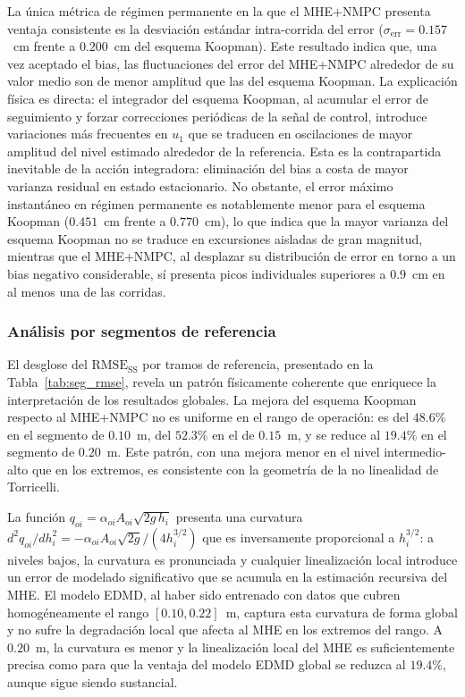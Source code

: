 \documentclass[12pt,letterpaper]{article}
\begin{document}
La única métrica de régimen permanente en la que el MHE+NMPC 
presenta ventaja consistente es la desviación estándar 
intra-corrida del error ($\sigma_{\mathrm{err}} = 0.157$~cm 
frente a $0.200$~cm del esquema Koopman). Este resultado indica 
que, una vez aceptado el bias, las fluctuaciones del error del 
MHE+NMPC alrededor de su valor medio son de menor amplitud que 
las del esquema Koopman. La explicación física es directa: el 
integrador del esquema Koopman, al acumular el error de 
seguimiento y forzar correcciones periódicas de la señal de 
control, introduce variaciones más frecuentes en $u_1$ que se 
traducen en oscilaciones de mayor amplitud del nivel estimado 
alrededor de la referencia. Esta es la contrapartida inevitable 
de la acción integradora: eliminación del bias a costa de mayor 
varianza residual en estado estacionario. No obstante, el error 
máximo instantáneo en régimen permanente es notablemente menor 
para el esquema Koopman ($0.451$~cm frente a $0.770$~cm), lo que 
indica que la mayor varianza del esquema Koopman no se traduce en 
excursiones aisladas de gran magnitud, mientras que el MHE+NMPC, 
al desplazar su distribución de error en torno a un bias negativo 
considerable, sí presenta picos individuales superiores a 
$0.9$~cm en al menos una de las corridas.

\subsubsection{Análisis por segmentos de referencia}
\label{sec:analisis_exp_seg}

El desglose del $\mathrm{RMSE}_{\mathrm{SS}}$ por tramos de 
referencia, presentado en la Tabla~\ref{tab:seg_rmse}, revela un 
patrón físicamente coherente que enriquece la interpretación de 
los resultados globales. La mejora del esquema Koopman respecto al 
MHE+NMPC no es uniforme en el rango de operación: es del $48.6\%$ 
en el segmento de $0.10$~m, del $52.3\%$ en el de $0.15$~m, y se 
reduce al $19.4\%$ en el segmento de $0.20$~m. Este patrón, con 
una mejora menor en el nivel intermedio-alto que en los extremos, 
es consistente con la geometría de la no linealidad de Torricelli.

La función $q_{oi} = \alpha_{oi} A_{oi} \sqrt{2g\,h_i}$ presenta 
una curvatura $d^2q_{oi}/dh_i^2 = -\alpha_{oi} A_{oi} \sqrt{2g} 
/ (4 h_i^{3/2})$ que es inversamente proporcional a $h_i^{3/2}$: 
a niveles bajos, la curvatura es pronunciada y cualquier 
linealización local introduce un error de modelado significativo 
que se acumula en la estimación recursiva del MHE. El modelo EDMD, 
al haber sido entrenado con datos que cubren homogéneamente el 
rango $[0.10, 0.22]$~m, captura esta curvatura de forma global y 
no sufre la degradación local que afecta al MHE en los extremos 
del rango. A $0.20$~m, la curvatura es menor y la linealización 
local del MHE es suficientemente precisa como para que la ventaja 
del modelo EDMD global se reduzca al $19.4\%$, aunque sigue siendo 
sustancial.
\end{document}
